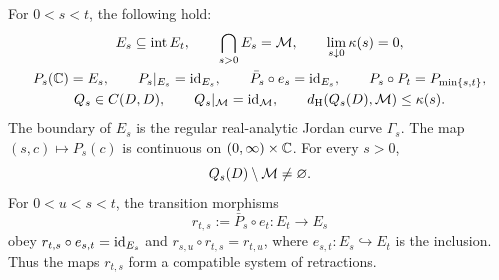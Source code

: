 \begin{theorem}
\label{thm:green-projection}
For \(0<s<t\), the following hold:
\begin{gather}
 E_s\subseteq\operatorname{int}E_t,\qquad
 \bigcap_{s>0}E_s=\mathcal M,\qquad
 \lim_{s\downarrow0}\kappa(s)=0,\label{eq:equipotential-distance}\\
 P_s(\mathbb C)=E_s,\qquad P_s|_{E_s}=\operatorname{id}_{E_s},\qquad
 \bar P_s\circ e_s=\operatorname{id}_{E_s},\qquad
 P_s\circ P_t=P_{\min\{s,t\}},\label{eq:retraction-composition}\\
 Q_s\in C(D,D),\qquad Q_s|_\mathcal M=\operatorname{id}_\mathcal M,\qquad
 d_{\mathrm H}(Q_s(D),\mathcal M)\le\kappa(s).\label{eq:Q-hausdorff-estimate}
\end{gather}
The boundary of \(E_s\) is the regular real-analytic Jordan curve
\(\Gamma_s\). The map \((s,c)\mapsto P_s(c)\) is continuous on
\((0,\infty)\times\mathbb C\). For every \(s>0\),
\[
 Q_s(D)\setminus\mathcal M\ne\varnothing.
\]
For \(0<u<s<t\), the transition morphisms
\[
 r_{t,s}:=\bar P_s\circ e_t:E_t\to E_s
\]
obey \(r_{t,s}\circ e_{s,t}=\operatorname{id}_{E_s}\) and
\(r_{s,u}\circ r_{t,s}=r_{t,u}\), where \(e_{s,t}:E_s\hookrightarrow E_t\)
is the inclusion. Thus the maps \(r_{t,s}\) form a compatible system
of retractions.
\end{theorem}
